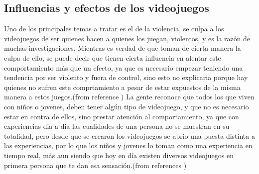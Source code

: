 \documentclass{bmcart}
\begin{document}
\subsection*{Influencias y efectos de los videojuegos}
Uno de los principales temas a tratar es el de la violencia, se culpa a los videojuegos de ser quienes hacen a quienes los juegan, violentos, y es la razón de muchas investigaciones. Mientras es verdad de que toman de cierta manera la culpa de ello, se puede decir que tienen cierta influencia en alentar este comportamiento más que un efecto, ya que es necesario empezar teniendo una tendencia por ser violento y fuera de control, sino esto no explicaria porque hay quienes no sufren este comprtamiento a pesar de estar expuestos de la misma manera a estos juegos.(from reference \cite{juegoycine} \cite{juegosviolencia})
\newline
\newline
La gente reconoce que todos los que viven con niños o jovenes, deben tener algún tipo de videojuego, y que no es necesario estar en contra de ellos, sino prestar atención al comportamiento, ya que con experiencias dia a dia las cualidades de una persona no se muestran en su totalidad, pero desde que se crearon los videojuegos se abrio una puesta distinta a las experiencias, por lo que los niños y jovenes lo toman como una experiencia en tiempo real, más aun siendo que hoy en día existen diversos videojuegos en primera persona que te dan esa sensación.(from references \cite{juegocuidado})
\end{document}
